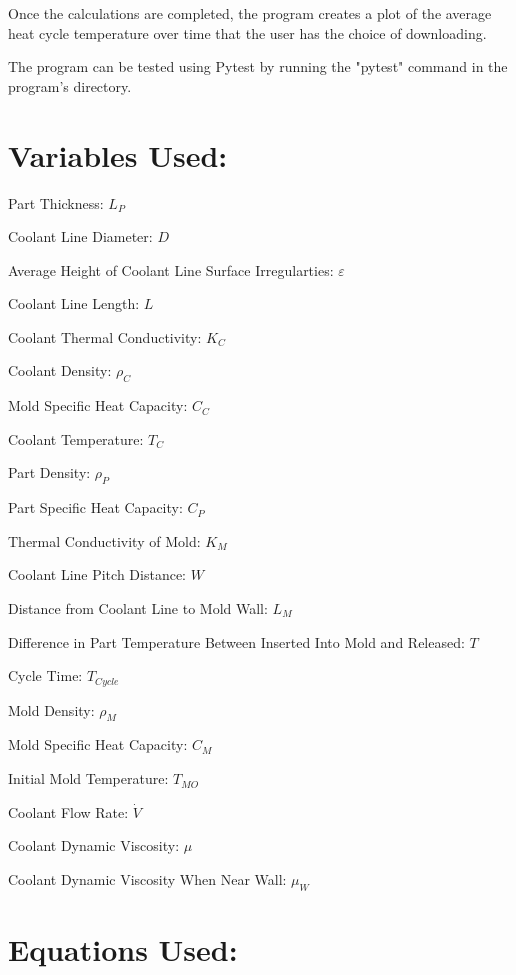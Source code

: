 \documentclass[a4paper,12pt]{article}
\begin{document}
\medskip

Once the calculations are completed, the program creates a plot of the average heat cycle temperature over time that the user has the choice of downloading.

\medskip

The program can be tested using Pytest by running the "pytest" command in the program's directory.

\clearpage

\section*{Variables Used:}

\medskip

Part Thickness: $L_{P}$

Coolant Line Diameter: $D$

Average Height of Coolant Line Surface Irregularties: $\varepsilon$

Coolant Line Length: $L$

Coolant Thermal Conductivity: $K_{C}$

Coolant Density: $\rho_{C}$

Mold Specific Heat Capacity: $C_{C}$

Coolant Temperature: $T_{C}$

Part Density: $\rho_{P}$

Part Specific Heat Capacity: $C_{P}$

Thermal Conductivity of Mold: $K_{M}$

Coolant Line Pitch Distance: $W$

Distance from Coolant Line to Mold Wall: $L_{M}$

Difference in Part Temperature Between Inserted Into Mold and Released: $T$

Cycle Time: $T_{Cycle}$

Mold Density: $\rho_{M}$

Mold Specific Heat Capacity: $C_{M}$

Initial Mold Temperature: $T_{MO}$

Coolant Flow Rate: $\dot{V}$

Coolant Dynamic Viscosity: $\mu$

Coolant Dynamic Viscosity When Near Wall: $\mu_{W}$

\clearpage

\section*{Equations Used:}
\end{document}
